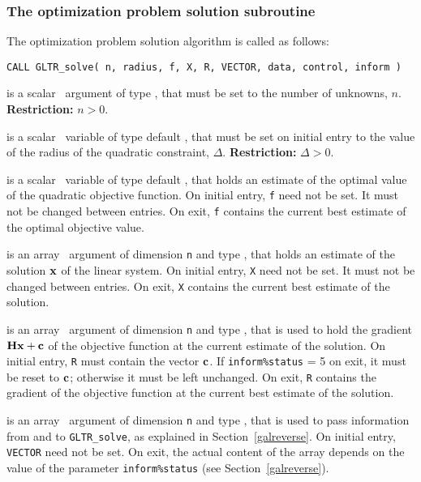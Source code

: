\documentclass{galahad}
\newcommand{\packagename}{GL\-TR}
\begin{document}

\subsubsection{The optimization problem solution subroutine}
The optimization problem solution algorithm is called as follows:

\hskip0.5in
{\tt CALL \packagename\_solve( n, radius, f, X, R, VECTOR, data, control, inform )}

\begin{description}

 is a scalar \intentin\ argument of type \integer, that must be
set to the number of unknowns, $n$. {\bf Restriction: } $n  >  0$.

 is a scalar \intentin\ variable of type default
\realdp,
that must be set on initial entry
to the value of the radius of the quadratic constraint, $\Delta$.
{\bf Restriction: } $\Delta > 0$.

 is a scalar \intentinout\ variable of type default
\realdp,
that holds an estimate of
the optimal value of the quadratic objective function.
On initial entry, {\tt f} need not be set.
It must not be changed between entries.
On exit, {\tt f} contains the current best estimate of the optimal objective
value.

 is an array \intentinout\ argument of dimension {\tt n} and
type \realdp,
that holds an estimate of the solution ${\mathbf{x}}$ of the linear system.
On initial entry, {\tt X} need not be set.
It must not be changed between entries.
On exit, {\tt X} contains the current best estimate of the solution.

 is an array \intentinout\ argument of dimension {\tt n} and
type \realdp,
that is used to hold the gradient ${\mathbf{H}} {\mathbf{x}}  +  {\mathbf{c}}$ of the objective
function at the current estimate of the solution.
On initial entry, {\tt R} must contain the vector ${\mathbf{c}}$.
If {\tt inform\%status} = 5 on exit, it must be reset to  ${\mathbf{c}}$; otherwise
it must be left unchanged. On exit, {\tt R} contains the gradient of the objective
function at the current best estimate of the solution.

 is an array \intentinout\ argument of dimension {\tt n}
and type \realdp,
that is used to pass information from and to {\tt \packagename\_solve},
as explained in Section~\ref{galreverse}.
On initial entry, {\tt VECTOR} need not be set. On exit, the actual content of
the array depends on the value of the parameter {\tt inform\%status}
(see Section~\ref{galreverse}).


\end{description}
\end{document}
